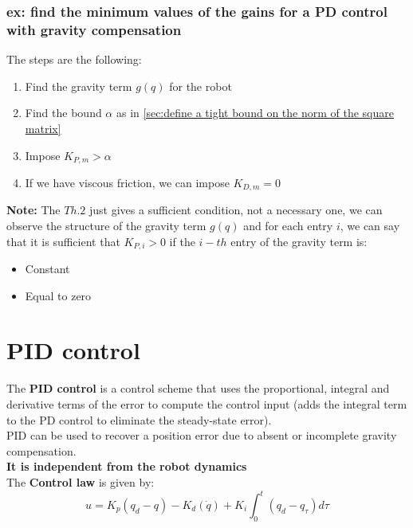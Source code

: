 \documentclass[a4paper,12pt]{article}
\begin{document}
\subsubsection{ex: find the minimum values of the gains for
 a PD control with gravity compensation}
The steps are the following:
\begin{enumerate}
    \item Find the gravity term $g(q)$ for the robot 
    \item Find  the bound $\alpha$ as in \ref{sec:define a tight bound on the norm of the square matrix}
    \item Impose $K_{P,m} > \alpha$
    \item If we have viscous friction, we can impose $K_{D,m} = 0$
\end{enumerate}
\textbf{Note:} The $Th.2$ just gives a sufficient condition, not a
     necessary one, we can observe the structure of the gravity term 
     $g(q)$ and for each entry $i$, we can say that it is sufficient that 
        $K_{P,i} > 0$ if the $i-th$ entry of the gravity term is: 
        \begin{itemize}
        \item Constant 
        \item Equal to zero
        \end{itemize}





\section{PID control}
The \textbf{PID control} is a control scheme that uses the
proportional, integral and derivative terms of the error to compute the
control input (adds the integral term to the PD control to eliminate
the steady-state error).\\
PID can be used to recover a position error due to absent or incomplete 
gravity compensation.\\
\textbf{It is independent from the robot dynamics}\\
The \textbf{Control law} is given by:
\begin{equation}
    u = K_p(q_d-q) - K_d(\dot{q}) + K_i \int_0^t (q_d-q_\tau)d\tau 
\end{equation}
\end{document}
